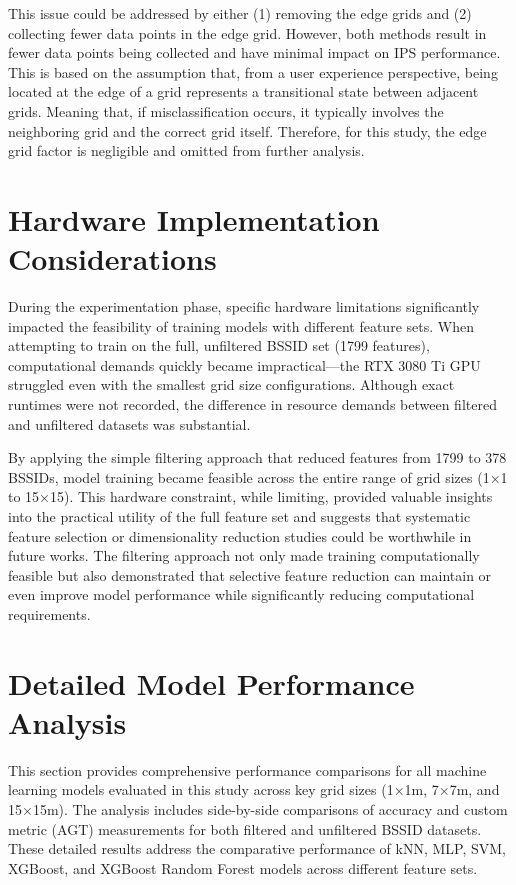 \documentclass[runningheads]{llncs}
\begin{document}
This issue could be addressed by either (1) removing the edge grids and (2) collecting fewer data points in the edge grid. However, both methods result in fewer data points being collected and have minimal impact on IPS performance. This is based on the assumption that, from a user experience perspective, being located at the edge of a grid represents a transitional state between adjacent grids. Meaning that, if misclassification occurs, it typically involves the neighboring grid and the correct grid itself. Therefore, for this study, the edge grid factor is negligible and omitted from further analysis.

\section{Hardware Implementation Considerations}
During the experimentation phase, specific hardware limitations significantly impacted the feasibility of training models with different feature sets. When attempting to train on the full, unfiltered BSSID set (1799 features), computational demands quickly became impractical—the RTX 3080 Ti GPU struggled even with the smallest grid size configurations. Although exact runtimes were not recorded, the difference in resource demands between filtered and unfiltered datasets was substantial.

By applying the simple filtering approach that reduced features from 1799 to 378 BSSIDs, model training became feasible across the entire range of grid sizes (1×1 to 15×15). This hardware constraint, while limiting, provided valuable insights into the practical utility of the full feature set and suggests that systematic feature selection or dimensionality reduction studies could be worthwhile in future works. The filtering approach not only made training computationally feasible but also demonstrated that selective feature reduction can maintain or even improve model performance while significantly reducing computational requirements.

\section{Detailed Model Performance Analysis}

This section provides comprehensive performance comparisons for all machine learning models evaluated in this study across key grid sizes (1×1m, 7×7m, and 15×15m). The analysis includes side-by-side comparisons of accuracy and custom metric (AGT) measurements for both filtered and unfiltered BSSID datasets. These detailed results address the comparative performance of kNN, MLP, SVM, XGBoost, and XGBoost Random Forest models across different feature sets.
\end{document}
